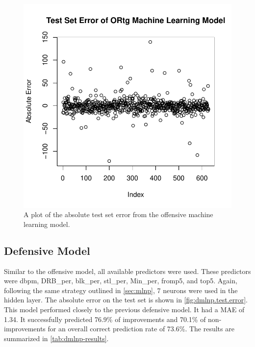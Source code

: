\documentclass[12pt]{article}
\begin{document}
\begin{figure}[tbp]
	\centering
	\includegraphics[width=\textwidth]{omlnp.test.error}
	\caption{A plot of the absolute test set error from the offensive machine learning model.}
	\label{fig:omlnp.test.error}
\end{figure}

\begin{table}[t]
\centering
{}
\caption{Offensive Neural Network Model Evaluators}
\label{tab:omlnp-results}
\end{table}

\subsection{Defensive Model}
\label{subsec:dmlnp}
Similar to the offensive model, all available predictors were used. These predictors were dbpm, DRB\_per, blk\_per, stl\_per, Min\_per, fromp5, and top5. Again, following the same strategy outlined in \autoref{sec:mlnp}, 7 neurons were used in the hidden layer. The absolute error on the test set is shown in \autoref{fig:dmlnp.test.error}. This model performed  closely to the previous defensive model. It had a MAE of 1.34. It successfully predicted 76.9\% of improvements and 70.1\% of non-improvements for an overall correct prediction rate of 73.6\%.  The results are summarized in \autoref{tab:dmlnp-results}.
\end{document}
